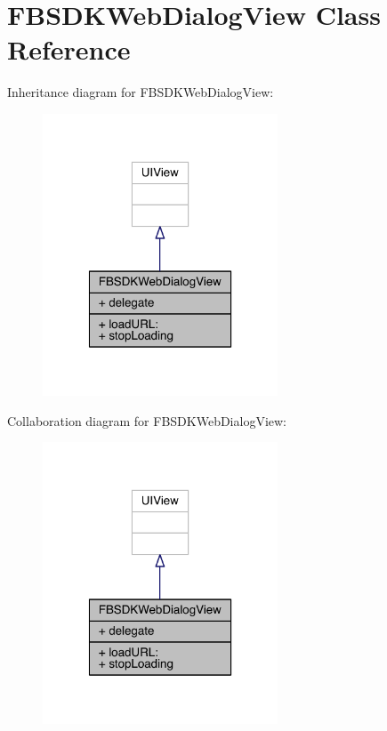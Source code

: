 \hypertarget{interface_f_b_s_d_k_web_dialog_view}{\section{F\-B\-S\-D\-K\-Web\-Dialog\-View Class Reference}
\label{interface_f_b_s_d_k_web_dialog_view}
}


Inheritance diagram for F\-B\-S\-D\-K\-Web\-Dialog\-View\-:
\nopagebreak
\begin{figure}[H]
\begin{center}
\leavevmode
\includegraphics[width=198pt]{interface_f_b_s_d_k_web_dialog_view__inherit__graph}
\end{center}
\end{figure}


Collaboration diagram for F\-B\-S\-D\-K\-Web\-Dialog\-View\-:
\nopagebreak
\begin{figure}[H]
\begin{center}
\leavevmode
\includegraphics[width=198pt]{interface_f_b_s_d_k_web_dialog_view__coll__graph}
\end{center}
\end{figure}
